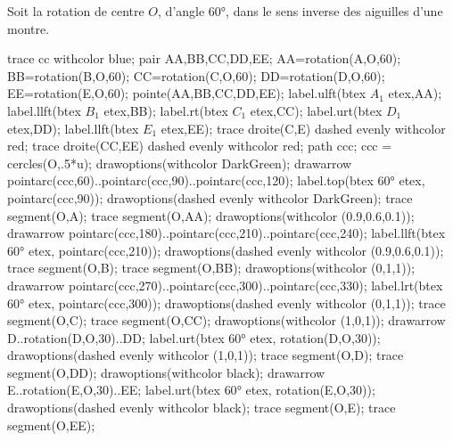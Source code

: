 \begin{corrige}
    Soit la rotation de centre $O$, d'angle \ang{60}, dans le sens inverse des aiguilles d'une montre.

    \hspace*{-15mm}
    \begin{Geometrie}[CoinHD={(9u,7u)}]        
        \enonceTroisiemeGTroisExoTreize
        trace cc withcolor blue;
        pair AA,BB,CC,DD,EE;
        AA=rotation(A,O,60);
        BB=rotation(B,O,60);
        CC=rotation(C,O,60);
        DD=rotation(D,O,60);
        EE=rotation(E,O,60);
        pointe(AA,BB,CC,DD,EE);        
        label.ulft(btex $A_1$ etex,AA);
        label.llft(btex $B_1$ etex,BB);
        label.rt(btex $C_1$ etex,CC);
        label.urt(btex $D_1$ etex,DD);
        label.llft(btex $E_1$ etex,EE);
        trace droite(C,E) dashed evenly withcolor red;
        trace droite(CC,EE) dashed evenly withcolor red;
        path ccc;
        ccc = cercles(O,.5*u);
        drawoptions(withcolor DarkGreen);
        drawarrow pointarc(ccc,60)..pointarc(ccc,90)..pointarc(ccc,120);
        label.top(btex $\ang{60}$ etex, pointarc(ccc,90));
        drawoptions(dashed evenly withcolor DarkGreen);
        trace segment(O,A);
        trace segment(O,AA);
        drawoptions(withcolor (0.9,0.6,0.1));
        drawarrow pointarc(ccc,180)..pointarc(ccc,210)..pointarc(ccc,240);
        label.llft(btex $\ang{60}$ etex, pointarc(ccc,210));
        drawoptions(dashed evenly withcolor (0.9,0.6,0.1));
        trace segment(O,B);
        trace segment(O,BB);
        drawoptions(withcolor (0,1,1));
        drawarrow pointarc(ccc,270)..pointarc(ccc,300)..pointarc(ccc,330);
        label.lrt(btex $\ang{60}$ etex, pointarc(ccc,300));
        drawoptions(dashed evenly withcolor (0,1,1));
        trace segment(O,C);
        trace segment(O,CC);
        drawoptions(withcolor (1,0,1));
        drawarrow D..rotation(D,O,30)..DD;
        label.urt(btex $\ang{60}$ etex, rotation(D,O,30));
        drawoptions(dashed evenly withcolor (1,0,1));
        trace segment(O,D);
        trace segment(O,DD);
        drawoptions(withcolor black);
        drawarrow E..rotation(E,O,30)..EE;
        label.urt(btex $\ang{60}$ etex, rotation(E,O,30));
        drawoptions(dashed evenly withcolor black);
        trace segment(O,E);
        trace segment(O,EE);
    \end{Geometrie}


\end{corrige}

